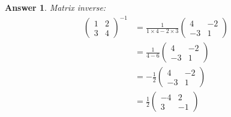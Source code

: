 \documentclass{article}
\newtheorem{answer}{Answer}
\begin{document}
\begin{answer}
  Matrix inverse:
  \begin{align}
    \begin{pmatrix}
      1 & 2 \\
      3 & 4
    \end{pmatrix}^{-1}
    &= \frac{1}{1\times 4 - 2 \times 3} 
    \begin{pmatrix}
      4 & -2 \\
      -3 & 1
    \end{pmatrix}\\
    &= \frac{1}{4 - 6}
    \begin{pmatrix}
      4 & -2 \\
      -3 & 1
    \end{pmatrix}\\
    &= - \frac{1}{2}
    \begin{pmatrix}
      4 & -2 \\
      -3 & 1
    \end{pmatrix}\\
    &= \frac{1}{2}
    \begin{pmatrix}
      - 4 & 2 \\
      3 & -1
    \end{pmatrix}
  \end{align}
\end{answer}
\end{document}
